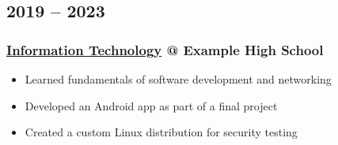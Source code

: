 \documentclass[a4paper,10pt]{article}
\makeatletter
\let\olditem\item
\renewcommand{\item}{\olditem \fontsize{4.2mm}{5.2mm}\selectfont}
\newcommand{\placeentry}[3]{\subsubsection{\fontsize{4.8mm}{0mm}\textbf{\color{primary} \href{#3}{#1} } \textbf{@} {\color{secondary} #2}}}
\makeatother
\begin{document}
\begin{minipage}[t][170mm]{0.63\textwidth}
    \subsection{2019 – 2023}
    \placeentry{Information Technology}{Example High School}{https://google.com}
    \begin{itemize}[noitemsep,topsep=0mm]
        \item Learned fundamentals of software development and networking
        \item Developed an Android app as part of a final project
        \item Created a custom Linux distribution for security testing
    \end{itemize}
\end{minipage}
\end{document}
